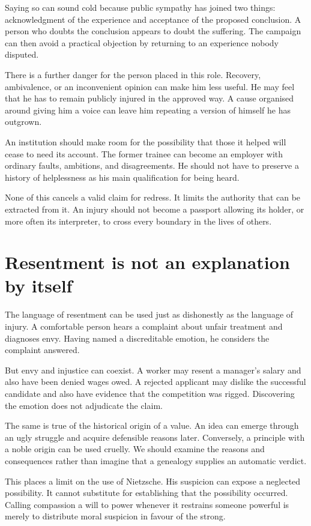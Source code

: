 \documentclass[12pt,a4paper]{book}
\begin{document}
Saying so can sound cold because public sympathy has joined two things: acknowledgment of the experience and acceptance of the proposed conclusion. A person who doubts the conclusion appears to doubt the suffering. The campaign can then avoid a practical objection by returning to an experience nobody disputed.

There is a further danger for the person placed in this role. Recovery, ambivalence, or an inconvenient opinion can make him less useful. He may feel that he has to remain publicly injured in the approved way. A cause organised around giving him a voice can leave him repeating a version of himself he has outgrown.

An institution should make room for the possibility that those it helped will cease to need its account. The former trainee can become an employer with ordinary faults, ambitions, and disagreements. He should not have to preserve a history of helplessness as his main qualification for being heard.

None of this cancels a valid claim for redress. It limits the authority that can be extracted from it. An injury should not become a passport allowing its holder, or more often its interpreter, to cross every boundary in the lives of others.

\section*{Resentment is not an explanation by itself}

The language of resentment can be used just as dishonestly as the language of injury. A comfortable person hears a complaint about unfair treatment and diagnoses envy. Having named a discreditable emotion, he considers the complaint answered.

But envy and injustice can coexist. A worker may resent a manager's salary and also have been denied wages owed. A rejected applicant may dislike the successful candidate and also have evidence that the competition was rigged. Discovering the emotion does not adjudicate the claim.

The same is true of the historical origin of a value. An idea can emerge through an ugly struggle and acquire defensible reasons later. Conversely, a principle with a noble origin can be used cruelly. We should examine the reasons and consequences rather than imagine that a genealogy supplies an automatic verdict.

This places a limit on the use of Nietzsche. His suspicion can expose a neglected possibility. It cannot substitute for establishing that the possibility occurred. Calling compassion a will to power whenever it restrains someone powerful is merely to distribute moral suspicion in favour of the strong.
\end{document}
